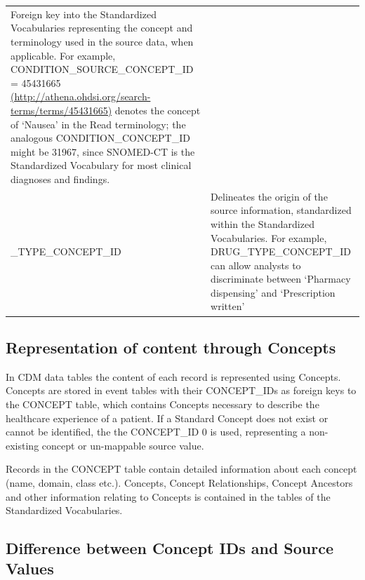 \documentclass[]{book}
\begin{document}
\begin{longtable}[]{@{}ll@{}}
\begin{minipage}[t]{0.71\columnwidth}
Foreign key into the Standardized Vocabularies representing the concept and terminology used in the source data, when applicable. For example, CONDITION\_SOURCE\_CONCEPT\_ID = 45431665 \href{http://athena.ohdsi.org/search-terms/terms/45431665}{(http://athena.ohdsi.org/search-terms/terms/45431665)} denotes the concept of `Nausea' in the Read terminology; the analogous CONDITION\_CONCEPT\_ID might be 31967, since SNOMED-CT is the Standardized Vocabulary for most clinical diagnoses and findings.\strut
\end{minipage}\tabularnewline
\begin{minipage}[t]{0.24\columnwidth}\raggedright
\_TYPE\_CONCEPT\_ID\strut
\end{minipage} & \begin{minipage}[t]{0.71\columnwidth}\raggedright
Delineates the origin of the source information, standardized within the Standardized Vocabularies. For example, DRUG\_TYPE\_CONCEPT\_ID can allow analysts to discriminate between `Pharmacy dispensing' and `Prescription written'\strut
\end{minipage}\tabularnewline
\bottomrule
\end{longtable}

\hypertarget{representation-of-content-through-concepts}{%
\subsection{Representation of content through Concepts}\label{representation-of-content-through-concepts}}

In CDM data tables the content of each record is represented using Concepts. Concepts are stored in event tables with their CONCEPT\_IDs as foreign keys to the CONCEPT table, which contains Concepts necessary to describe the healthcare experience of a patient. If a Standard Concept does not exist or cannot be identified, the the CONCEPT\_ID 0 is used, representing a non-existing concept or un-mappable source value.

Records in the CONCEPT table contain detailed information about each concept (name, domain, class etc.). Concepts, Concept Relationships, Concept Ancestors and other information relating to Concepts is contained in the tables of the Standardized Vocabularies.

\hypertarget{difference-between-concept-ids-and-source-values}{%
\subsection{Difference between Concept IDs and Source Values}\label{difference-between-concept-ids-and-source-values}}
\end{document}
